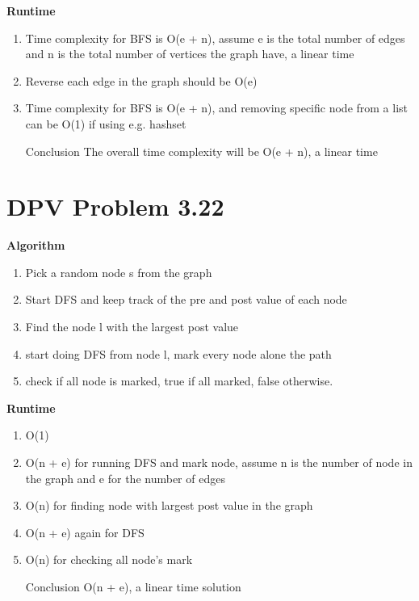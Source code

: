 \documentclass{article}
\begin{document}
\begin{enumerate}[a)]
\begin{enumerate}[Step 1]
    \end{enumerate} 
    \textbf{Runtime}
    \begin{enumerate}[Step 1]
        \item Time complexity for BFS is O(e + n), assume e is the total number of edges and n is the total number of vertices the graph have, a linear time
        \item Reverse each edge in the graph should be O(e) 
        \item Time complexity for BFS is O(e + n), and removing specific node from a list can be O(1) if using e.g. hashset
        \item [Conclusion] The overall time complexity will be O(e + n), a linear time
    \end{enumerate}
\end{enumerate}

\section{DPV Problem 3.22}

\textbf{Algorithm}

\begin{enumerate}[Step 1]
    \item Pick a random node s from the graph
    \item Start DFS and keep track of the pre and post value of each node
    \item Find the node l with the largest post value 
    \item start doing DFS from node l, mark every node alone the path
    \item check if all node is marked, true if all marked, false otherwise.
\end{enumerate}

\textbf{Runtime}

\begin{enumerate}[Step 1]
    \item O(1)
    \item O(n + e) for running DFS and mark node, assume n is the number of node in the graph and e for the number of edges
    \item O(n) for finding node with largest post value in the graph
    \item O(n + e) again for DFS
    \item O(n) for checking all node's mark
    \item [Conclusion] O(n + e), a linear time solution
\end{enumerate}
\end{document}
